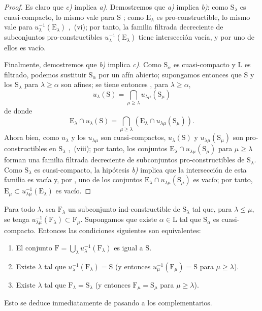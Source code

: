 \begin{proof}
Es claro que \emph{c)} implica \emph{a)}.
Demostremos que \emph{a)} implica \emph{b)}: como $\mathrm{S}_\lambda$ es cuasi-compacto, lo mismo vale para $\mathrm{S}$ ; como $\mathrm{E}_\lambda$ es pro-constructible, lo mismo vale para $u_\lambda^{-1}(\mathrm{E}_\lambda)$ ,~(vi); por tanto, la familia filtrada decreciente de subconjuntos pro-constructibles $u_\lambda^{-1}(\mathrm{E}_\lambda)$ tiene intersección vacía, y por  uno de ellos es vacío.

Finalmente, demostremos que \emph{b)} implica \emph{c)}.
Como $\mathrm{S}_\alpha$ es cuasi-compacto y $\mathrm{L}$ es filtrado, podemos sustituir $\mathrm{S}_\alpha$ por un afín abierto; supongamos entonces  que $\mathrm{S}$ y los $\mathrm{S}_\lambda$ para $\lambda\geqslant\alpha$ son afines; se tiene entonces , para $\lambda\geqslant\alpha$,
\[
  u_\lambda(\mathrm{S})=\bigcap_{\mu\geqslant\lambda}u_{\lambda\mu}(\mathrm{S}_\mu)
\]
de donde
\[
  \mathrm{E}_\lambda\cap u_\lambda(\mathrm{S})=\bigcap_{\mu\geqslant\lambda}(\mathrm{E}_\lambda\cap u_{\lambda\mu}(\mathrm{S}_\mu)).
\]
Ahora bien, como $u_\lambda$ y los $u_{\lambda\mu}$ son cuasi-compactos, $u_\lambda(\mathrm{S})$ y $u_{\lambda\mu}(\mathrm{S}_\mu)$ son pro-constructibles en $\mathrm{S}_\lambda$ ,~(viii); por tanto, los conjuntos $\mathrm{E}_\lambda\cap u_{\lambda\mu}(\mathrm{S}_\mu)$ para $\mu\geqslant\lambda$ forman una familia filtrada decreciente de subconjuntos pro-constructibles de $\mathrm{S}_\lambda$.
Como $\mathrm{S}_\lambda$ es cuasi-compacto, la hipótesis \emph{b)} implica que la intersección de esta familia es vacía y, por , uno de los conjuntos $\mathrm{E}_\lambda\cap u_{\lambda\mu}(\mathrm{S}_\mu)$ es vacío; por tanto, $\mathrm{E}_\mu\subset u_{\lambda\mu}^{-1}(\mathrm{E}_\lambda)$ es vacío.
\end{proof}

\begin{corollary}[8.3.4]
\label{IV.8.3.4}
Para todo $\lambda$, sea $\mathrm{F}_\lambda$ un subconjunto ind-constructible de $\mathrm{S}_\lambda$ tal que, para $\lambda\leqslant\mu$, se tenga $u_{\lambda\mu}^{-1}(\mathrm{F}_\lambda)\subset\mathrm{F}_\mu$.
Supongamos que existe $\alpha\in\mathrm{L}$ tal que $\mathrm{S}_\alpha$ es cuasi-compacto.
Entonces las condiciones siguientes son equivalentes:
\begin{enumerate}[label=\emph{\alph*)}]
   \item El conjunto $\mathrm{F}=\bigcup_\lambda u_\lambda^{-1}(\mathrm{F}_\lambda)$ es igual a $\mathrm{S}$.
   \item Existe $\lambda$ tal que $u_\lambda^{-1}(\mathrm{F}_\lambda)=\mathrm{S}$ (y entonces $u_\mu^{-1}(\mathrm{F}_\mu)=\mathrm{S}$ para $\mu\geqslant\lambda$).
   \item Existe $\lambda$ tal que $\mathrm{F}_\lambda=\mathrm{S}_\lambda$ (y entonces $\mathrm{F}_\mu=\mathrm{S}_\mu$ para $\mu\geqslant\lambda$).
\end{enumerate}
Esto se deduce inmediatamente de  pasando a los complementarios.
\end{corollary}

